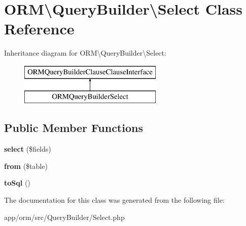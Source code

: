 \hypertarget{classORM_1_1QueryBuilder_1_1Select}{}\section{O\+RM\textbackslash{}Query\+Builder\textbackslash{}Select Class Reference}
\label{classORM_1_1QueryBuilder_1_1Select}
Inheritance diagram for O\+RM\textbackslash{}Query\+Builder\textbackslash{}Select\+:\begin{figure}[H]
\begin{center}
\leavevmode
\includegraphics[height=2.000000cm]{classORM_1_1QueryBuilder_1_1Select}
\end{center}
\end{figure}
\subsection*{Public Member Functions}
\begin{DoxyCompactItemize}
\item 
{\bfseries select} (\$fields)\hypertarget{classORM_1_1QueryBuilder_1_1Select_af92f97fa5b109f2cda2f19871091d3ea}{}\label{classORM_1_1QueryBuilder_1_1Select_af92f97fa5b109f2cda2f19871091d3ea}

\item 
{\bfseries from} (\$table)\hypertarget{classORM_1_1QueryBuilder_1_1Select_a409edcda34f3394b62ce56fb83a87c01}{}\label{classORM_1_1QueryBuilder_1_1Select_a409edcda34f3394b62ce56fb83a87c01}

\item 
{\bfseries to\+Sql} ()\hypertarget{classORM_1_1QueryBuilder_1_1Select_ac7b7ba6da5777a53932936db8b2e3bbe}{}\label{classORM_1_1QueryBuilder_1_1Select_ac7b7ba6da5777a53932936db8b2e3bbe}

\end{DoxyCompactItemize}


The documentation for this class was generated from the following file\+:\begin{DoxyCompactItemize}
\item 
app/orm/src/\+Query\+Builder/Select.\+php\end{DoxyCompactItemize}
